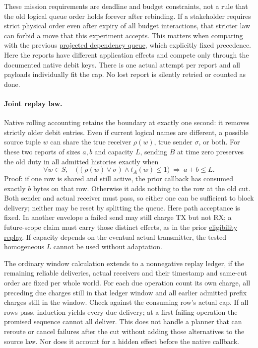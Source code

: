 \documentclass{article}
\begin{document}
These mission requirements are deadline and budget constraints,
not a rule that the old logical queue order holds forever after
rebinding. If a stakeholder requires strict physical order
even after expiry of all budget interactions, that stricter law
can forbid a move that this experiment accepts. This matters
when comparing with the previous
\href{https://github.com/eternal-november/eos-research-programmes/pull/567}{projected
dependency queue}, which explicitly fixed precedence. Here the
reports have different application effects and compete only
through the documented native debit keys. There is one actual
attempt per report and all payloads individually fit the cap.
No lost report is silently retried or counted as done.

\paragraph{Joint replay law.}
Native rolling accounting retains the boundary at exactly one
second: it removes strictly older debit entries. Even if current
logical names are different, a possible source tuple \(w\) can
share the true receiver \(\rho(w)\), true sender \(\sigma\), or both.
For these two reports of sizes \(a,b\) and capacity \(L\), sending
\(B\) at time zero preserves the old duty in all admitted histories
exactly when
\[
 \forall w\in S,\quad
 \bigl((\rho(w)\lor\sigma)\land t_A(w)\le 1\bigr)
 \ \Longrightarrow\ a+b\le L.
\]
Proof: if one row is shared and still active, the prior callback
has consumed exactly \(b\) bytes on that row. Otherwise it adds
nothing to the row at the old cut. Both sender and actual receiver
must pass, so either one can be sufficient to block delivery;
neither may be reset by splitting the queue. Here path acceptance
is fixed. In another envelope a failed send may still charge TX
but not RX; a future-scope claim must carry those distinct effects,
as in the prior
\href{https://github.com/eternal-november/eos-research-programmes/pull/618}{eligibility
replay}. If capacity depends on the eventual actual transmitter,
the tested homogeneous \(L\) cannot be used without adaptation.

The ordinary window calculation extends to a nonnegative replay
ledger, if the remaining reliable deliveries, actual receivers
and their timestamp and same-cut order are fixed per whole world.
For each due operation count its own charge, all preceding due
charges still in that ledger window and all earlier admitted
prefix charges still in the window. Check against the consuming
row's actual cap. If all rows pass, induction yields every due
delivery; at a first failing operation the promised sequence
cannot all deliver. This does not handle a planner that can
reroute or cancel failures after the cut without adding those
alternatives to the source law. Nor does it account for a hidden
effect before the native callback.
\end{document}
